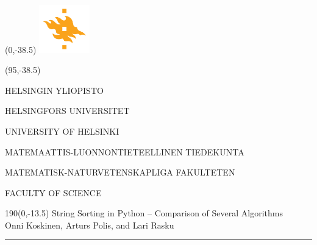  

\begin{textblock}{95}(0,-38.5)
\includegraphics[width=22mm]{flame}
\end{textblock} 

\begin{textblock}{95}(95,-38.5)
{\fontsize{8}{7}\selectfont\sffamily\color{unigray}
\hfill HELSINGIN YLIOPISTO

\hfill HELSINGFORS UNIVERSITET

\hfill UNIVERSITY OF HELSINKI

\color{sciorange}\hfill MATEMAATTIS-LUONNONTIETEELLINEN TIEDEKUNTA

\hfill MATEMATISK-NATURVETENSKAPLIGA FAKULTETEN

\hfill FACULTY OF SCIENCE %


}
\end{textblock}


\begin{textblock}{190}(0,-13.5)
{\sffamily\LARGE{\color{sciorange}String Sorting in Python -- }{\color{unigray}
 Comparison of Several Algorithms}}\\
\small\hfill Onni Koskinen, Arturs Polis, and Lari Rasku\\ %
\rule[2mm]{190mm}{0.3pt} %
\end{textblock}